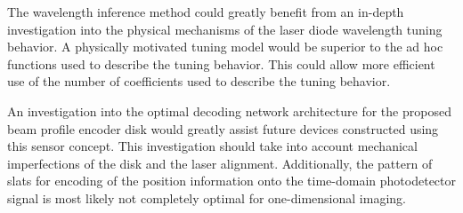 \documentclass[8pt,a4paper]{report}
\begin{document}
	The wavelength inference method could greatly benefit from an in-depth investigation into the physical mechanisms of the laser diode wavelength tuning behavior. A physically motivated tuning model would be superior to the ad hoc functions used to describe the tuning behavior. This could allow more efficient use of the number of coefficients used to describe the tuning behavior.
	
	An investigation into the optimal decoding network architecture for the proposed beam profile encoder disk would greatly assist future devices constructed using this sensor concept. This investigation should take into account mechanical imperfections of the disk and the laser alignment. Additionally, the pattern of slats for encoding of the position information onto the time-domain photodetector signal is most likely not completely optimal for one-dimensional imaging. 
	
	\cleardoublepage

	
	
	\renewcommand{\bibname}{REFERENCES}
	
	
	

%		
%		
%		
\end{document}
